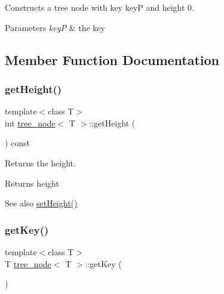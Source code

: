 Constructs a tree node with key keyP and height 0. 
\begin{DoxyParams}{Parameters}
{\em keyP} & the key \\
\hline
\end{DoxyParams}


\subsection{Member Function Documentation}
\mbox{\label{classtree__node_a57c8b2000ad0a13b67532b81ba73720b}} 
\subsubsection{\texorpdfstring{get\+Height()}{getHeight()}}
{\footnotesize\ttfamily template$<$class T$>$ \\
int \hyperlink{classtree__node}{tree\+\_\+node}$<$ T $>$\+::get\+Height (\begin{DoxyParamCaption}{ }\end{DoxyParamCaption}) const\hspace{0.3cm}{\ttfamily [inline]}}

Returns the height. \begin{DoxyReturn}{Returns}
height 
\end{DoxyReturn}
\begin{DoxySeeAlso}{See also}
\hyperlink{classtree__node_a159ebd6d96c0e2111eb0ef6a36d50471}{set\+Height()} 
\end{DoxySeeAlso}
\mbox{\label{classtree__node_afbe2d91ad009570338290ed9eb8a7485}} 
\subsubsection{\texorpdfstring{get\+Key()}{getKey()}}
{\footnotesize\ttfamily template$<$class T$>$ \\
T \hyperlink{classtree__node}{tree\+\_\+node}$<$ T $>$\+::get\+Key (\begin{DoxyParamCaption}{ }\end{DoxyParamCaption})\hspace{0.3cm}{\ttfamily [inline]}}

